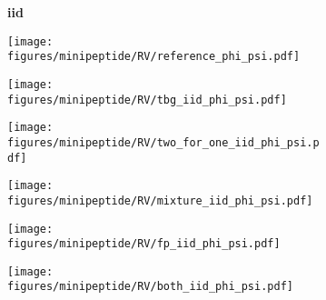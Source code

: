 \begin{figure}
    \begin{minipage}{\textwidth}
        \begin{subfigure}[c]{0.05\textwidth}
        \vspace{-0.2cm}
            \textbf{iid}
        \end{subfigure}
        \begin{subfigure}[c]{0.15\textwidth}
            \centering
            \texttt{[image: figures/minipeptide/RV/reference\_phi\_psi.pdf]}
        \end{subfigure}
        \begin{subfigure}[c]{0.15\textwidth}
            \centering
            \texttt{[image: figures/minipeptide/RV/tbg\_iid\_phi\_psi.pdf]}
        \end{subfigure}
        \begin{subfigure}[c]{0.15\textwidth}
            \centering
            \texttt{[image: figures/minipeptide/RV/two\_for\_one\_iid\_phi\_psi.pdf]}
        \end{subfigure}
        \begin{subfigure}[c]{0.15\textwidth}
            \centering
            \texttt{[image: figures/minipeptide/RV/mixture\_iid\_phi\_psi.pdf]}
        \end{subfigure}
        \begin{subfigure}[c]{0.15\textwidth}
            \centering
            \texttt{[image: figures/minipeptide/RV/fp\_iid\_phi\_psi.pdf]}
        \end{subfigure}
        \begin{subfigure}[c]{0.15\textwidth}
            \centering
            \texttt{[image: figures/minipeptide/RV/both\_iid\_phi\_psi.pdf]}         
        \end{subfigure}
    \end{minipage}


\end{figure}
